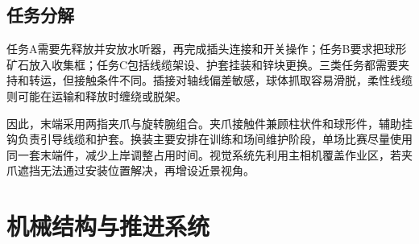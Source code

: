 \begin{center}\begin{minipage}{\linewidth}\centering{}\end{minipage}\end{center}

\subsection{任务分解}

任务A需要先释放并安放水听器，再完成插头连接和开关操作；任务B要求把球形矿石放入收集框；任务C包括线缆架设、护套挂装和锌块更换。三类任务都需要夹持和转运，但接触条件不同。插接对轴线偏差敏感，球体抓取容易滑脱，柔性线缆则可能在运输和释放时缠绕或脱架。\par

因此，末端采用两指夹爪与旋转腕组合。夹爪接触件兼顾柱状件和球形件，辅助挂钩负责引导线缆和护套。换装主要安排在训练和场间维护阶段，单场比赛尽量使用同一套末端件，减少上岸调整占用时间。视觉系统先利用主相机覆盖作业区，若夹爪遮挡无法通过安装位置解决，再增设近景视角。\par

\section{机械结构与推进系统}

